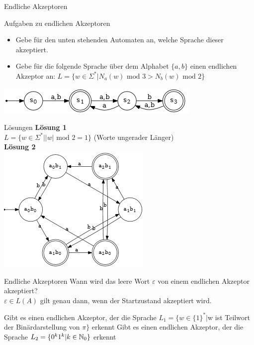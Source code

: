 \documentclass[handout]{beamer}
\begin{document}
\begin{frame}{Endliche Akzeptoren}
	\begin{taskblock}{Aufgaben zu endlichen Akzeptoren}
		\begin{itemize}
			\item Gebe für den unten stehenden Automaten an, welche Sprache dieser akzeptiert.
			\item Gebe für die folgende Sprache über dem Alphabet $\{a,b\}$ einen endlichen Akzeptor an:
			$L = \{w \in \Sigma^* | N_a(w) \text{ mod } 3 > N_b(w) \text{ mod } 2\}$
		\end{itemize}
	\end{taskblock}

	\includegraphics[scale=0.7]{images/AufgAkzeptor1.png}
\end{frame}

\begin{frame}{Lösungen}	
	\textbf{Lösung 1}\\
	$L = \{w \in \Sigma^* | |w| \text{ mod } 2 = 1\}$ (Worte ungerader Länger)\\
	\pause
	\textbf{Lösung 2}\\
	\includegraphics[scale=0.8]{images/LoesAkzeptor.png}
\end{frame}

\begin{frame}{Endliche Akzeptoren}
	Wann wird das leere Wort $\varepsilon$ von einem endlichen Akzeptor akzeptiert?\\
	\pause
	$\varepsilon \in L(A)$ gilt genau dann, wenn der Startzustand akzeptiert wird.
\end{frame}

\begin{frame}
Gibt es einen endlichen Akzeptor, der die Sprache $L_1=\{w \in \{1\}^*|$w ist Teilwort der Binärdarstellung von $ \pi\}$ erkennt \newline \pause
Gibt es einen endlichen Akzeptor, der die Sprache $L_2=\{0^k1^k|k\in \mathbb{N}_0\}$ erkennt
\end{frame}
\end{document}
